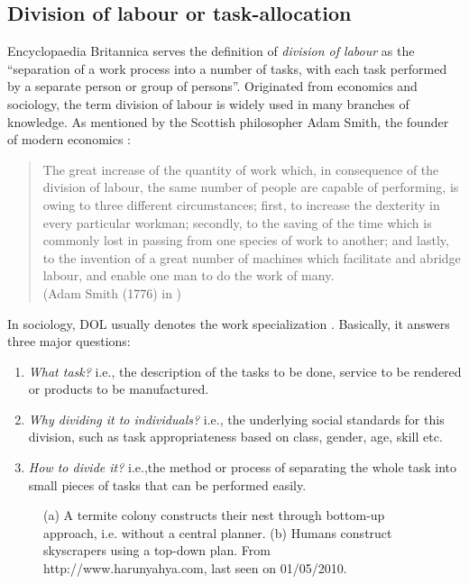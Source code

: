 \subsection{Division of labour or task-allocation}
\label{bg:def:dol}
Encyclopaedia Britannica serves the definition of {\em division of labour} as the ``separation of a work process into a number of tasks, with each task performed by a separate person or group of persons''. Originated from economics and sociology, the term division of labour is widely used in many branches of knowledge. As mentioned by the Scottish philosopher Adam Smith, the founder of modern economics :
\begin{quotation} 
The great increase of the quantity of work which, in consequence of the division of labour, the same number of people are capable of performing, is owing to three different circumstances; first, to increase the dexterity in every particular workman; secondly, to the saving of the time which is commonly lost in passing from one species of work to another; and lastly, to the invention of a great number of machines which facilitate and abridge labour, and enable one man to do the work of many.\\
(Adam Smith (1776) in )
\end{quotation} 
In sociology, DOL usually denotes the work specialization \cite{Sayer+1992}. Basically, it answers three major questions:
\begin{enumerate}
\item {\em What task?} i.e., the description of the tasks to be done, service to be rendered or products to be manufactured.
\item {\em Why dividing it to individuals?} i.e., the underlying social standards for this division, such as task appropriateness based on class, gender, age, skill etc.
\item {\em How to divide it?} i.e.,the method or process of separating the whole task into small pieces of tasks that can be performed easily. 
\end{enumerate}
\begin{figure}[htp]
\centering
{} 
\hspace{0.25cm}
\caption{(a) A termite colony constructs their nest through bottom-up approach, i.e. without a central planner. (b) Humans construct skyscrapers using a top-down plan. From http://www.harunyahya.com, last seen on 01/05/2010.}
\label{fig:termite-nest}
\end{figure}
